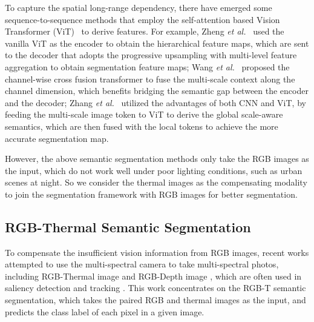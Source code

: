 \documentclass[10.5pt,twocolumn,journal,letterpaper]{IEEEtran}
\newcommand{\etal}{\textit{et al.}}
\begin{document}
To capture the spatial long-range dependency, there have emerged some sequence-to-sequence methods that employ the self-attention based Vision Transformer (ViT)~\cite{dosovitskiy-arxiv2020-vit} to derive features. For example, Zheng \etal~\cite{zheng-cvpr2021-setr} used the vanilla ViT as the encoder to obtain the hierarchical feature maps, which are sent to the decoder that adopts the progressive upsampling with multi-level feature aggregation to obtain segmentation feature maps; Wang \etal~\cite{wang-aaai2022-uctransnet} proposed the channel-wise cross fusion transformer to fuse the multi-scale context along the channel dimension, which benefits bridging the semantic gap between the encoder and the decoder; Zhang \etal~\cite{zhang-cvpr2022topformer} utilized the advantages of both CNN and ViT, by feeding the multi-scale image token to ViT to derive the global scale-aware semantics, which are then fused with the local tokens to achieve the more accurate segmentation map.

However, the above semantic segmentation methods only take the RGB images as the input, which do not work well under poor lighting conditions, such as urban scenes at night. So we consider the thermal images as the compensating modality to join the segmentation framework with RGB images for better segmentation.

\subsection{RGB-Thermal Semantic Segmentation} 
To compensate the insufficient vision information from RGB images, recent works \cite{ha-iros2017-mfnet, shivakumar-icra2020-pst900, fan-tnnls2020-rethinking} attempted to use the multi-spectral camera to take multi-spectral photos, including RGB-Thermal image and RGB-Depth image \cite{zhu-tmm2023-s3net}, which are often used in saliency detection \cite{liu-tmm2020-fusion, cong-tmm2022-thermal, tu-tmm2022-adfnet} and tracking \cite{xu-tmm2021-multimodal}. This work concentrates on the RGB-T semantic segmentation, which takes the paired RGB and thermal images as the input, and predicts the class label of each pixel in a given image. 
\end{document}
